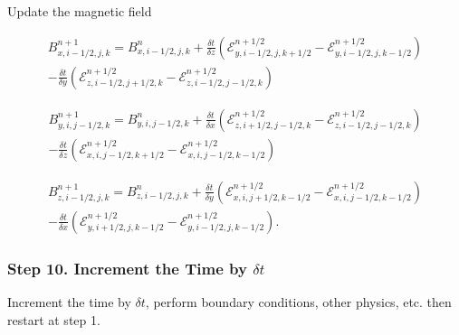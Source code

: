 Update the magnetic field

\begin{equation}
    \begin{aligned}
        B^{n+1}_{x,i-1/2,j,k} = B^{n}_{x,i-1/2,j,k}
        + \frac{\delta t}{\delta z} \left( \mathcal{E}^{n+1/2}_{y,i-1/2,j,k+1/2} - \mathcal{E}^{n+1/2}_{y,i-1/2,j,k-1/2} \right) \\
        - \frac{\delta t}{\delta y} \left( \mathcal{E}^{n+1/2}_{z,i-1/2,j+1/2,k} - \mathcal{E}^{n+1/2}_{z,i-1/2,j-1/2,k} \right)
    \end{aligned}
\end{equation}

\begin{equation}
    \begin{aligned}
        B^{n+1}_{y,i,j-1/2,k} = B^{n}_{y,i,j-1/2,k}
        + \frac{\delta t}{\delta x} \left( \mathcal{E}^{n+1/2}_{z,i+1/2,j-1/2,k} - \mathcal{E}^{n+1/2}_{z,i-1/2,j-1/2,k} \right) \\
        - \frac{\delta t}{\delta z} \left( \mathcal{E}^{n+1/2}_{x,i,j-1/2,k+1/2} - \mathcal{E}^{n+1/2}_{x,i,j-1/2,k-1/2} \right)
    \end{aligned}
\end{equation}

\begin{equation}
    \begin{aligned}
        B^{n+1}_{z,i-1/2,j,k} = B^{n}_{z,i-1/2,j,k}
        + \frac{\delta t}{\delta y} \left( \mathcal{E}^{n+1/2}_{x,i,j+1/2,k-1/2} - \mathcal{E}^{n+1/2}_{x,i,j-1/2,k-1/2} \right) \\
        - \frac{\delta t}{\delta x} \left( \mathcal{E}^{n+1/2}_{y,i+1/2,j,k-1/2} - \mathcal{E}^{n+1/2}_{y,i-1/2,j,k-1/2} \right).
    \end{aligned}
\end{equation}

\subsubsection{Step 10. Increment the Time by \texorpdfstring{$\delta t$}{dt}}
\label{vlct:increment-time}

Increment the time by $\delta t$, perform boundary conditions, other physics, etc. then restart at step 1.
